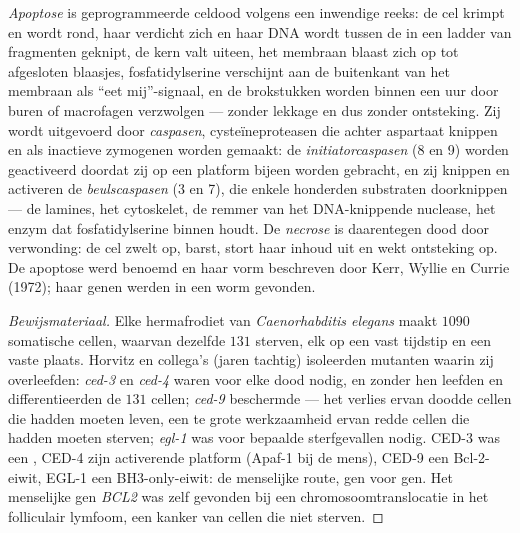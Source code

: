 \begin{definition}[Apoptose]\label{def:b3:cell-cycle-apoptosis:apoptosis}
\emph{Apoptose} is geprogrammeerde celdood volgens een inwendige reeks:
de cel krimpt en wordt rond, haar  verdicht zich en haar DNA
wordt tussen de  in een ladder van fragmenten geknipt, de
kern valt uiteen, het membraan blaast zich op tot afgesloten blaasjes,
fosfatidylserine verschijnt aan de buitenkant van het membraan als
``eet mij''-signaal, en de brokstukken worden binnen een uur door buren
of macrofagen verzwolgen --- zonder lekkage en dus zonder ontsteking.
Zij wordt uitgevoerd door \emph{caspasen}, cysteïneproteasen die achter
aspartaat knippen en als inactieve zymogenen worden gemaakt: de
\emph{initiatorcaspasen} (8 en 9) worden geactiveerd doordat zij op een
platform bijeen worden gebracht, en zij knippen en activeren de
\emph{beulscaspasen} (3 en 7), die enkele honderden substraten
doorknippen --- de lamines, het cytoskelet, de remmer van het
DNA-knippende nuclease, het enzym dat fosfatidylserine binnen houdt. De
\emph{necrose} is daarentegen dood door verwonding: de cel zwelt op,
barst, stort haar inhoud uit en wekt ontsteking op. De apoptose werd
benoemd en haar vorm beschreven door Kerr, Wyllie en Currie (1972);
haar genen werden in een worm gevonden.
\end{definition}

\begin{proof}[Bewijsmateriaal]
Elke hermafrodiet van \emph{Caenorhabditis elegans} maakt $1090$
somatische cellen, waarvan dezelfde $131$ sterven, elk op een vast
tijdstip en een vaste plaats. Horvitz en collega's (jaren tachtig)
isoleerden mutanten waarin zij overleefden: \emph{ced-3} en
\emph{ced-4} waren voor elke dood nodig, en zonder hen leefden en
differentieerden de $131$ cellen; \emph{ced-9} beschermde --- het
verlies ervan doodde cellen die hadden moeten leven, een te grote
werkzaamheid ervan redde cellen die hadden moeten sterven;
\emph{egl-1} was voor bepaalde sterfgevallen nodig. CED-3 was een
, CED-4 zijn activerende platform (Apaf-1 bij de mens), CED-9
een Bcl-2-eiwit, EGL-1 een BH3-only-eiwit: de menselijke route, gen
voor gen. Het menselijke gen \emph{BCL2} was zelf gevonden bij een
chromosoomtranslocatie in het folliculair lymfoom, een kanker van
cellen die niet sterven.
\end{proof}


